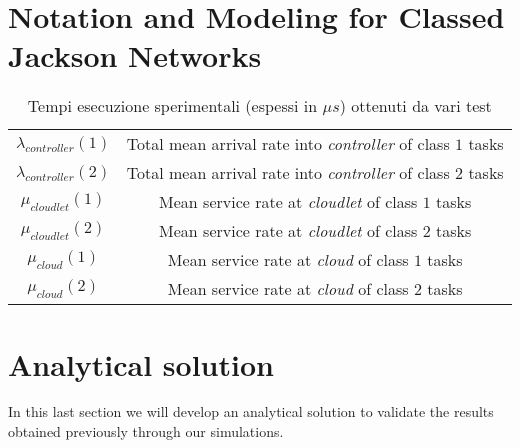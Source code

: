\documentclass[10pt,a4paper]{article}
\begin{document}
\section{Notation and Modeling for Classed Jackson Networks}



\begin{table}
\caption{Tempi esecuzione sperimentali (espessi in $\mu s$) ottenuti da vari test}\label{table:diana}
\begin{center}
\begin{tabular}{cc}

\toprule

$\lambda_{controller}(1)$ & Total mean arrival rate into \textit{controller} of class $1$ tasks \\
$\lambda_{controller}(2)$ & Total mean arrival rate into \textit{controller} of class $2$ tasks \\
$\mu_{cloudlet}(1)$ & Mean service rate at \textit{cloudlet} of class $1$ tasks \\
$\mu_{cloudlet}(2)$ & Mean service rate at \textit{cloudlet} of class $2$ tasks \\
$\mu_{cloud}(1)$ & Mean service rate at \textit{cloud} of class $1$ tasks \\
$\mu_{cloud}(2)$ & Mean service rate at \textit{cloud} of class $2$ tasks \\
\end{tabular}
\end{center}
\end{table}

\newpage
\section{Analytical solution}

In this last section we will develop an analytical solution to validate the results obtained previously through our simulations.
\end{document}
